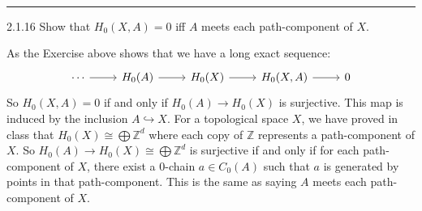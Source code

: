 \documentclass[a4paper, 11pt]{article}
\begin{document}
\\ 
\noindent\rule{7in}{2.8pt}
\begin{problem}{2.1.16}
Show that \(H_0(X,A)=0\) iff \(A\) meets each path-component of \(X\).
\end{problem}
\begin{solution}
As the Exercise above shows that we have a long exact sequence:
$$\begin{tikzcd}
	\cdots & {H_0(A)} & {H_0(X)} & {H_0(X,A)} & 0
	\arrow[from=1-1, to=1-2]
	\arrow[from=1-2, to=1-3]
	\arrow[from=1-3, to=1-4]
	\arrow[from=1-4, to=1-5]
\end{tikzcd}$$
So \(H_0(X,A)=0\) if and only if \(H_0(A)\rightarrow H_0(X)\) is surjective. This map is induced by the inclusion \(A\hookrightarrow X\). 
For a topological space \(X\), we have proved in class that \(H_0(X)\cong \bigoplus \mathbb{Z}^d\) where each copy of \(\mathbb{Z}\) represents a path-component 
of \(X\). So \(H_0(A)\rightarrow H_0(X)\cong \bigoplus \mathbb{Z}^d\) is surjective if and only if for each path-component of \(X\), there exist a 0-chain \(a\in C_0(A)\) such that 
\(a\) is generated by points in that path-component. This is the same as saying \(A\) meets each path-component of \(X\).
\end{solution}
\\ 
\end{document}
